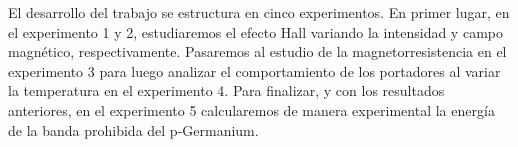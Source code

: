 El desarrollo del trabajo se estructura en cinco experimentos. En primer lugar, en el experimento 1 y 2, estudiaremos el efecto Hall variando la intensidad y campo magnético, respectivamente. Pasaremos al estudio de la magnetorresistencia en el experimento 3 para luego analizar el comportamiento de los portadores al variar la temperatura en el experimento 4. Para finalizar, y con los resultados anteriores, en el experimento 5 calcularemos de manera experimental la energía de la banda prohibida del p-Germanium.